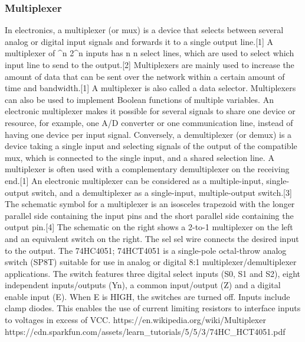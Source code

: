 \subsubsection{Multiplexer}
In electronics, a multiplexer (or mux) is a device that selects between several analog or digital input signals and forwards it to a single output line.[1] A multiplexer of {^{n}} 2^{n} inputs has {\displaystyle n} n select lines, which are used to select which input line to send to the output.[2] Multiplexers are mainly used to increase the amount of data that can be sent over the network within a certain amount of time and bandwidth.[1] A multiplexer is also called a data selector. Multiplexers can also be used to implement Boolean functions of multiple variables.
An electronic multiplexer makes it possible for several signals to share one device or resource, for example, one A/D converter or one communication line, instead of having one device per input signal.
Conversely, a demultiplexer (or demux) is a device taking a single input and selecting signals of the output of the compatible mux, which is connected to the single input, and a shared selection line. A multiplexer is often used with a complementary demultiplexer on the receiving end.[1]
An electronic multiplexer can be considered as a multiple-input, single-output switch, and a demultiplexer as a single-input, multiple-output switch.[3] The schematic symbol for a multiplexer is an isosceles trapezoid with the longer parallel side containing the input pins and the short parallel side containing the output pin.[4] The schematic on the right shows a 2-to-1 multiplexer on the left and an equivalent switch on the right. The {\displaystyle sel} sel wire connects the desired input to the output.
The 74HC4051; 74HCT4051 is a single-pole octal-throw analog switch (SP8T) suitable for use in analog or digital 8:1 multiplexer/demultiplexer applications. The switch features three digital select inputs (S0, S1 and S2), eight independent inputs/outputs (Yn), a common input/output (Z) and a digital enable input (E). When E is HIGH, the switches are turned off. Inputs include clamp diodes. This enables the use of current limiting resistors to interface inputs to voltages in excess of VCC.
https://en.wikipedia.org/wiki/Multiplexer
https://cdn.sparkfun.com/assets/learn_tutorials/5/5/3/74HC_HCT4051.pdf

